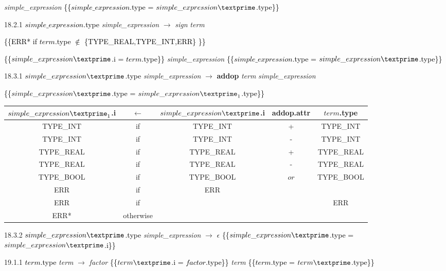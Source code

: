 \emph{simple\_expression\textprime} \textcolor{black}{\{\{$simple\_expression$.type = $simple\_expression\textprime$.type\}\}}

18.2.1 \textcolor{black}{$simple\_expression$.type} \emph{simple\_expression} $\rightarrow$ \emph{sign} \emph{term}

\textcolor{black}{\{\{ERR* if $term$.type $\notin$ \{TYPE\_REAL,TYPE\_INT,ERR\} \}\}}

\textcolor{black}{\{\{$simple\_expression\textprime$.i = $term$.type\}\}}
 \emph{simple\_expression\textprime} \textcolor{black}{\{\{$simple\_expression$.type = $simple\_expression\textprime$.type\}\}}

 18.3.1  \textcolor{black}{$simple\_expression\textprime$.type} \emph{simple\_expression\textprime} $\rightarrow$ \textbf{addop} \emph{term} \emph{simple\_expression\textprime}

 \textcolor{black}{\{\{$simple\_expression\textprime$.type = $simple\_expression\textprime_1$.type\}\}}

\begin{tabular}[t]{|c|c|c|c|c|}
  \hline

 $simple\_expression\textprime_1$.i & \textbf{$\leftarrow$} & $simple\_expression\textprime$.i & \textbf{addop}.attr &  $term$.type \\

  \hline

  TYPE\_INT & if & TYPE\_INT & + & TYPE\_INT \\
  TYPE\_INT & if & TYPE\_INT & - & TYPE\_INT \\
  TYPE\_REAL & if & TYPE\_REAL & + & TYPE\_REAL \\
  TYPE\_REAL & if & TYPE\_REAL & - & TYPE\_REAL \\
  TYPE\_BOOL & if & TYPE\_BOOL & $or$ & TYPE\_BOOL \\
  ERR & if & ERR & & \\
  ERR & if & & & ERR \\
  ERR* & otherwise & & & \\
  \hline

\end{tabular}

18.3.2 \textcolor{black}{$simple\_expression\textprime$.type} \emph{simple\_expression\textprime} $\rightarrow$ $\epsilon$ \textcolor{black}{\{\{$simple\_expression\textprime$.type = $simple\_expression\textprime$.i\}\}}

19.1.1 \textcolor{black}{$term$.type} \emph{term} $\rightarrow$ \emph{factor} \textcolor{black}{\{\{$term\textprime$.i = $factor$.type\}\}} \emph{term\textprime} \textcolor{black}{\{\{$term$.type = $term\textprime$.type\}\}}

